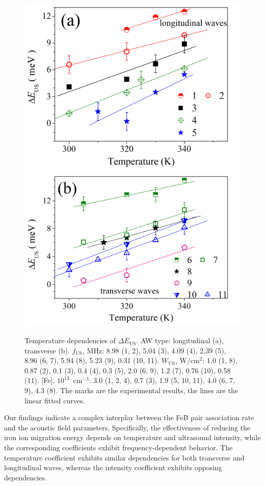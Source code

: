 \documentclass{ttp}
\begin{document}
\begin{figure}
	\centering
     \includegraphics[width=0.4\linewidth]{Fig5a.png}
     \includegraphics[width=0.4\linewidth]{Fig5b.png}
	  \caption{Temperature dependencies of $\Delta E_\mathrm{US}$.
       AW type: longitudinal (a), transverse (b).
       $f_\mathrm{US}$, MHz:  8.98 (1, 2), 5.04 (3),
       4.09 (4), 2.39 (5), 8.96 (6, 7), 5.94 (8), 5.23 (9), 0.31 (10, 11).
       $W_\mathrm{US}$, W/cm$^2$: 1.0 (1, 8), 0.87 (2), 0.1 (3), 0.4 (4), 0.3 (5), 2.0 (6, 9), 1.2 (7),
        0.76 (10), 0.58 (11).
        [Fe], $10^{13}$~cm$^{-3}$: 3.0 (1, 2, 4), 0.7 (3), 1.9 (5, 10, 11), 4.0 (6, 7, 9), 4.3 (8).
        The marks are the experimental results, the lines are the linear fitted curves.
}\label{fig5}
\end{figure}

Our findings indicate a complex interplay between the FeB pair association rate
and the acoustic field parameters.
Specifically, the effectiveness of reducing the iron ion migration energy
depends on temperature and ultrasound intensity,
while the corresponding coefficients exhibit frequency-dependent behavior.
The temperature coefficient exhibits similar dependencies for both transverse and longitudinal waves,
whereas the intensity coefficient exhibits opposing dependencies.
\end{document}
